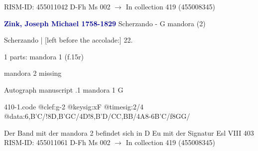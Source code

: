 \documentclass[twocolumn]{book}
\begin{document}
\newline RISM-ID: 455011042
\newline D-Fh  Ms 002
\newline $\rightarrow$ In collection 419 (455008345)
      
\newline \par \vspace{7pt} \textcolor{darkblue}{\textbf{Zink, Joseph Michael  1758-1829}}
\newline Scherzando - G
\newline mandora (2)
\newline \begin{itshape}[f.15r, at left:] Scherzando | [left before the accolade:] 22.\end{itshape} 
\newline \textcolor{darkblue}{}  1 parts: mandora 1  (f.15r)
\newline \begin{small} mandora 2 missing\end{small} 
\newline Autograph manuscript
.1  mandora 1  G  
\begin{filecontents*}{410-1.code}
@clef:g-2
@keysig:xF
@timesig:2/4
@data:{6,B'C}/!8D,B'GC/4D!8,B'D/CC,BB/4A8-{6B'C}/f{8GG}/
\end{filecontents*}
\newline
%

\newline Der Band mit der mandora 2 befindet sich in D Eu mit der Signatur Esl VIII 403
\newline RISM-ID: 455011061
\newline D-Fh  Ms 002
\newline $\rightarrow$ In collection 419 (455008345)
      
\end{document}
